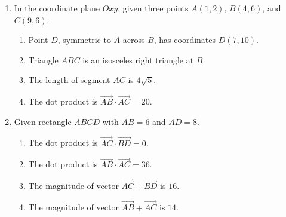 \documentclass[10pt,a4paper]{article}
\begin{document}
\begin{enumerate}
\item In the coordinate plane $Oxy$, given three points $A(1, 2)$, $B(4, 6)$, and $C(9, 6)$.
\begin{enumerate}
    \item Point $D$, symmetric to $A$ across $B$, has coordinates $D(7, 10)$.
    \item Triangle $ABC$ is an isosceles right triangle at $B$.
    \item The length of segment $AC$ is $4\sqrt{5}$.
    \item The dot product is $\vec{AB} \cdot \vec{AC} = 20$.
\end{enumerate}

\item Given rectangle $ABCD$ with $AB = 6$ and $AD = 8$.
\begin{enumerate}
    \item The dot product is $\vec{AC} \cdot \vec{BD} = 0$.
    \item The dot product is $\vec{AB} \cdot \vec{AC} = 36$.
    \item The magnitude of vector $\vec{AC} + \vec{BD}$ is $16$.
    \item The magnitude of vector $\vec{AB} + \vec{AC}$ is $14$.
\end{enumerate}
\end{enumerate}
\end{document}
